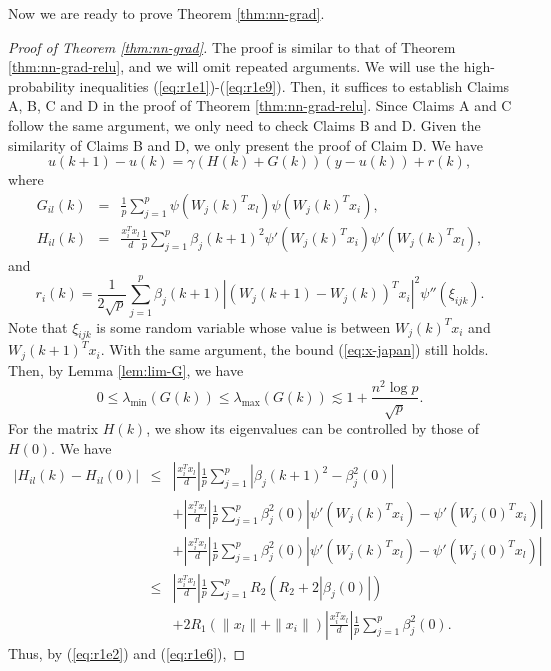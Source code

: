 Now we are ready to prove Theorem \ref{thm:nn-grad}.
\begin{proof}[Proof of Theorem \ref{thm:nn-grad}]
The proof is similar to that of Theorem \ref{thm:nn-grad-relu}, and we will omit repeated arguments. We will use the high-probability inequalities (\ref{eq:r1e1})-(\ref{eq:r1e9}). Then, it suffices to establish Claims A, B, C and D in the proof of Theorem \ref{thm:nn-grad-relu}. Since Claims A and C follow the same argument, we only need to check Claims B and D. Given the similarity of Claims B and D, we only present the proof of Claim D. We have
\begin{equation}
u(k+1)-u(k)=\gamma(H(k)+G(k))(y-u(k))+r(k), \label{eq:iter-u-arctan}
\end{equation}
where
\begin{eqnarray*}
G_{il}(k) &=& \frac{1}{p}\sum_{j=1}^p\psi(W_j(k)^Tx_l)\psi(W_j(k)^Tx_i), \\
H_{il}(k) &=& \frac{x_i^Tx_l}{d}\frac{1}{p}\sum_{j=1}^p\beta_j(k+1)^2\psi'(W_j(k)^Tx_i)\psi'(W_j(k)^Tx_l),
\end{eqnarray*}
and
$$r_i(k)=\frac{1}{2\sqrt{p}}\sum_{j=1}^p\beta_j(k+1)|(W_j(k+1)-W_j(k))^Tx_i|^2\psi''(\xi_{ijk}).$$
Note that $\xi_{ijk}$ is some random variable whose value is between $W_j(k)^Tx_i$ and $W_j(k+1)^Tx_i$. With the same argument, the bound (\ref{eq:x-japan}) still holds. Then, by Lemma \ref{lem:lim-G}, we have
\begin{equation}
0 \leq \lambda_{\min}(G(k)) \leq \lambda_{\max}(G(k)) \lesssim 1+\frac{n^2\log p}{\sqrt{p}}. \label{eq:Gk-spec-arctan}
\end{equation}
For the matrix $H(k)$, we show its eigenvalues can be controlled by those of $H(0)$. We have
\begin{eqnarray*}
|H_{il}(k)-H_{il}(0)| &\leq& \left|\frac{x_i^Tx_l}{d}\right|\frac{1}{p}\sum_{j=1}^p|\beta_j(k+1)^2-\beta_j^2(0)| \\
&& + \left|\frac{x_i^Tx_l}{d}\right|\frac{1}{p}\sum_{j=1}^p\beta_j^2(0)|\psi'(W_j(k)^Tx_i) - \psi'(W_j(0)^Tx_i)| \\
&& + \left|\frac{x_i^Tx_l}{d}\right|\frac{1}{p}\sum_{j=1}^p\beta_j^2(0)|\psi'(W_j(k)^Tx_l) - \psi'(W_j(0)^Tx_l)| \\
&\leq& \left|\frac{x_i^Tx_l}{d}\right|\frac{1}{p}\sum_{j=1}^pR_2(R_2+2|\beta_j(0)|) \\
&& + 2R_1\left(\|x_l\| + \|x_i\|\right)\left|\frac{x_i^Tx_l}{d}\right|\frac{1}{p}\sum_{j=1}^p\beta_j^2(0).
\end{eqnarray*}
Thus, by (\ref{eq:r1e2}) and (\ref{eq:r1e6}),

\end{proof}
